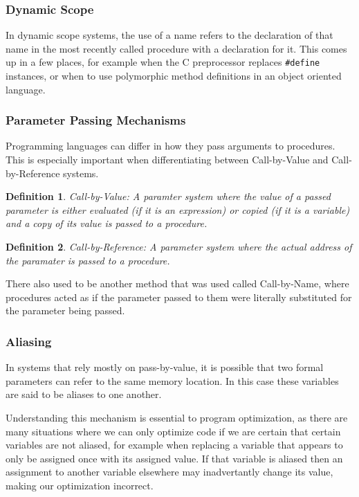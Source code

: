 \documentclass[titlepage]{article}
\newtheorem{definition}{Definition}
\begin{document}
\subsubsection*{Dynamic Scope}
In dynamic scope systems, the use of a name refers to the declaration of that name in the most recently called procedure with a declaration for it. This comes up in a few places, for example when the C preprocessor replaces \texttt{#define} instances, or when to use polymorphic method definitions in an object oriented language.

\subsubsection*{Parameter Passing Mechanisms}
Programming languages can differ in how they pass arguments to procedures. This is especially important when differentiating between Call-by-Value and Call-by-Reference systems.

\begin{definition}
    \emph{Call-by-Value}: A paramter system where the value of a passed parameter is either evaluated (if it is an expression) or copied (if it is a variable) and a copy of its value is passed to a procedure.
\end{definition}

\begin{definition}
    \emph{Call-by-Reference}: A parameter system where the actual address of the paramater is passed to a procedure.
\end{definition}

There also used to be another method that was used called Call-by-Name, where procedures acted as if the parameter passed to them were literally substituted for the parameter being passed.

\subsubsection*{Aliasing}
In systems that rely mostly on pass-by-value, it is possible that two formal parameters can refer to the same memory location. In this case these variables are said to be aliases to one another.

Understanding this mechanism is essential to program optimization, as there are many situations where we can only optimize code if we are certain that certain variables are not aliased, for example when replacing a variable that appears to only be assigned once with its assigned value. If that variable is aliased then an assignment to another variable elsewhere may inadvertantly change its value, making our optimization incorrect.
\end{document}
